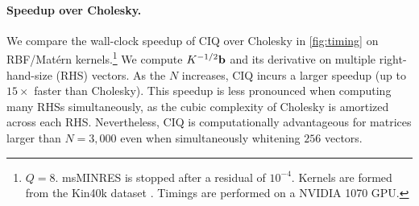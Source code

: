 \paragraph{Speedup over Cholesky.}
We compare the wall-clock speedup of CIQ over Cholesky in \cref{fig:timing} on RBF/Mat\'ern kernels.\footnote{
  $Q=8$.
  msMINRES is stopped after a residual of $10^{-4}$.
  Kernels are formed from the Kin40k dataset \citep{asuncion2007uci}.
  Timings are performed on a NVIDIA 1070 GPU.
}
We compute $K^{-1/2} \mathbf{b}$ and its derivative on multiple right-hand-size (RHS) vectors.
As the $N$ increases, CIQ incurs a larger speedup (up to $15\times$ faster than Cholesky).
This speedup is less pronounced when computing many RHSs simultaneously, as the cubic complexity of Cholesky is amortized across each RHS.
Nevertheless, CIQ is computationally advantageous for matrices larger than $N=3,\!000$ even when simultaneously whitening $256$ vectors.
